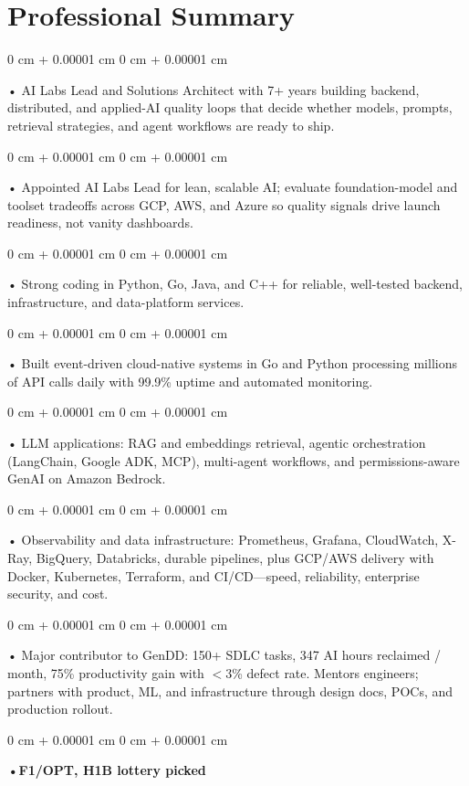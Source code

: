 \documentclass[10pt, letterpaper]{article}
\newenvironment{onecolentry}{
    \begin{adjustwidth}{
        0 cm + 0.00001 cm
    }{
        0 cm + 0.00001 cm
    }
}{
    \end{adjustwidth}
} %
\begin{document}
    \section{Professional Summary}
        \vspace{2 pt }
        \begin{onecolentry}
            • AI Labs Lead and Solutions Architect with 7+ years building backend, distributed, and applied-AI quality loops that decide whether models, prompts, retrieval strategies, and agent workflows are ready to ship.
        \end{onecolentry}
        \begin{onecolentry}
            • Appointed AI Labs Lead for lean, scalable AI; evaluate foundation-model and toolset tradeoffs across GCP, AWS, and Azure so quality signals drive launch readiness, not vanity dashboards.
        \end{onecolentry}
        \begin{onecolentry}
            • Strong coding in Python, Go, Java, and C++ for reliable, well-tested backend, infrastructure, and data-platform services.
        \end{onecolentry}
        \begin{onecolentry}
            • Built event-driven cloud-native systems in Go and Python processing millions of API calls daily with 99.9\% uptime and automated monitoring.
        \end{onecolentry}
        \begin{onecolentry}
            • LLM applications: RAG and embeddings retrieval, agentic orchestration (LangChain, Google ADK, MCP), multi-agent workflows, and permissions-aware GenAI on Amazon Bedrock.
        \end{onecolentry}
        \begin{onecolentry}
            • Observability and data infrastructure: Prometheus, Grafana, CloudWatch, X-Ray, BigQuery, Databricks, durable pipelines, plus GCP/AWS delivery with Docker, Kubernetes, Terraform, and CI/CD---speed, reliability, enterprise security, and cost.
        \end{onecolentry}
        \begin{onecolentry}
            • Major contributor to GenDD: 150+ SDLC tasks, 347 AI hours reclaimed / month, 75\% productivity gain with $<$3\% defect rate. Mentors engineers; partners with product, ML, and infrastructure through design docs, POCs, and production rollout.
        \end{onecolentry}
        \begin{onecolentry}
                \textbf{•F1/OPT, H1B lottery picked}
        \end{onecolentry}
\end{document}
